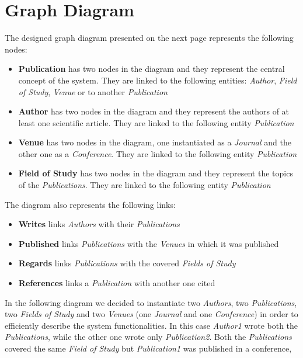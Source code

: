 \documentclass{Configuration_Files/PoliMi3i_thesis}
\begin{document}
\chapter{Graph Diagram}
The designed graph diagram presented on the next page represents the following nodes:
\begin{itemize}
    \item \textbf{Publication} has two nodes in the diagram and they represent the central concept of the system. They are
        linked to the following entities: \emph{Author}, \emph{Field of Study}, \emph{Venue} or to another \emph{Publication}
    \item \textbf{Author} has two nodes in the diagram and they represent the authors of at least one scientific article.
        They are linked to the following entity \emph{Publication}
    \item \textbf{Venue} has two nodes in the diagram, one instantiated as a \emph{Journal} and the other one as a 
        \emph{Conference}. They are linked to the following entity \emph{Publication}
    \item \textbf{Field of Study} has two nodes in the diagram and they represent the topics of the \emph{Publications}. 
        They are linked to the following entity \emph{Publication}
\end{itemize}
\bigskip
The diagram also represents the following links:
\begin{itemize}
    \item \textbf{Writes} links \emph{Authors} with their \emph{Publications}
    \item \textbf{Published} links \emph{Publications} with the \emph{Venues} in which it was published
    \item \textbf{Regards} links \emph{Publications} with the covered \emph{Fields of Study}
    \item \textbf{References} links a \emph{Publication} with another one cited
\end{itemize}
\bigskip
In the following diagram we decided to instantiate two \emph{Authors}, two \emph{Publications}, two \emph{Fields of Study} and
two \emph{Venues} (one \emph{Journal} and one \emph{Conference}) in order to efficiently describe the system functionalities. \newline
In this case \emph{Author1} wrote both the \emph{Publications}, while the other one wrote only \emph{Publication2}.
Both the \emph{Publications} covered the same \emph{Field of Study} but \emph{Publication1} was published in a conference,
\end{document}
